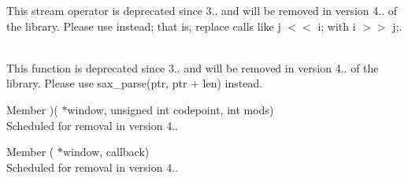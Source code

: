 \begin{DoxyRefList}
\label{deprecated__deprecated000006}%
%
This stream operator is deprecated since 3.. and will be removed in version 4.. of the library. Please use  instead; that is, replace calls like {\ttfamily j \texorpdfstring{$<$}{<}\texorpdfstring{$<$}{<} i;} with {\ttfamily i \texorpdfstring{$>$}{>}\texorpdfstring{$>$}{>} j;}.  
\item[Member \doxylink{classbasic__json_ad018e709338c810c56eaad606186a77e}{basic\+\_\+json\texorpdfstring{$<$}{<} Object\+Type, Array\+Type, String\+Type, Boolean\+Type, Number\+Integer\+Type, Number\+Unsigned\+Type, Number\+Float\+Type, Allocator\+Type, JSONSerializer, Binary\+Type, Custom\+Base\+Class \texorpdfstring{$>$}{>}\+::sax\+\_\+parse} (\doxylink{classdetail_1_1span__input__adapter}{detail\+::span\+\_\+input\+\_\+adapter} \&\&i, SAX \texorpdfstring{$\ast$}{*}sax, input\+\_\+format\+\_\+t format=input\+\_\+format\+\_\+t\+::json, const bool strict=true, const bool ignore\+\_\+comments=false)]\hfill \\
\label{deprecated__deprecated000005}%
%
This function is deprecated since 3.. and will be removed in version 4.. of the library. Please use sax\+\_\+parse(ptr, ptr + len) instead.  
\item[Member \doxylink{group__input_gac3cf64f90b6219c05ac7b7822d5a4b8f}{GLFWcharmodsfun} )(\doxylink{group__window_ga3c96d80d363e67d13a41b5d1821f3242}{GLFWwindow} \texorpdfstring{$\ast$}{*}window, unsigned int codepoint, int mods)]\hfill \\
\label{deprecated__deprecated000001}%
%
Scheduled for removal in version 4.. 
\item[Member \doxylink{group__input_ga359a8529c2eb06e6e2173168f30ac99c}{glfw\+Set\+Char\+Mods\+Callback} (\doxylink{group__window_ga3c96d80d363e67d13a41b5d1821f3242}{GLFWwindow} \texorpdfstring{$\ast$}{*}window, \doxylink{group__input_gac3cf64f90b6219c05ac7b7822d5a4b8f}{GLFWcharmodsfun} callback)]\hfill \\
\label{deprecated__deprecated000002}%
%
Scheduled for removal in version 4..
\end{DoxyRefList}